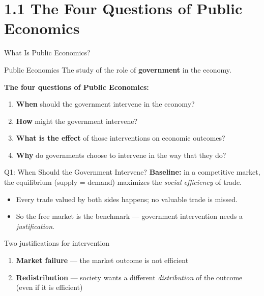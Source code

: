 \documentclass[11pt,aspectratio=169]{beamer}
\begin{document}
\section{1.1 The Four Questions of Public Economics}

\begin{frame}{What Is Public Economics?}
  \begin{block}{Public Economics}
    The study of the role of \textbf{government} in the economy.
  \end{block}
  \vspace{1em}
  \textbf{The four questions of Public Economics:}
  \begin{enumerate}
    \item \textbf{When} should the government intervene in the economy?
    \item \textbf{How} might the government intervene?
    \item \textbf{What is the effect} of those interventions on economic outcomes?
    \item \textbf{Why} do governments choose to intervene in the way that they do?
  \end{enumerate}
\end{frame}

\begin{frame}{Q1: When Should the Government Intervene?}
  \textbf{Baseline:} in a competitive market, the equilibrium (supply = demand) maximizes the \emph{social efficiency} of trade.
  \begin{itemize}
    \item Every trade valued by both sides happens; no valuable trade is missed.
    \item So the free market is the benchmark --- government intervention needs a \emph{justification}.
  \end{itemize}
  \vspace{1em}
  \begin{alertblock}{Two justifications for intervention}
    \begin{enumerate}
      \item \textbf{Market failure} --- the market outcome is not efficient
      \item \textbf{Redistribution} --- society wants a different \emph{distribution} of the outcome (even if it is efficient)
    \end{enumerate}
  \end{alertblock}
\end{frame}
\end{document}
